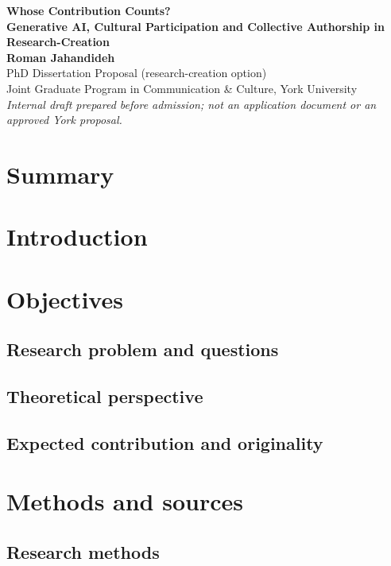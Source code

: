 \documentclass[letterpaper,12pt]{article}
\begin{document}
\begin{center}
  {\bf\Large Whose Contribution Counts?}\\[4pt]
  {\bf\large Generative AI, Cultural Participation and Collective Authorship in Research-Creation}\\[12pt]
  {\bf Roman Jahandideh}\\[3pt]
  PhD Dissertation Proposal (research-creation option)\\
  Joint Graduate Program in Communication \& Culture, York University\\[3pt]
  \textit{Internal draft prepared before admission; not an application
  document or an approved York proposal.}
\end{center}

\section*{Summary}


\section{Introduction}


\section{Objectives}

\subsection{Research problem and questions}


\subsection{Theoretical perspective}


\subsection{Expected contribution and originality}


\section{Methods and sources}

\subsection{Research methods}

\end{document}
